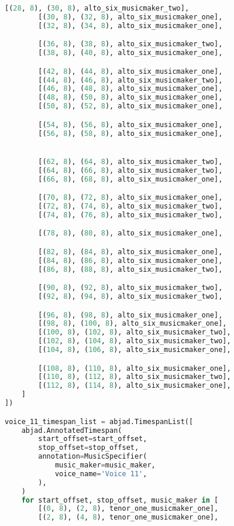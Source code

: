 \begin{lstlisting}[language=Python, caption=Invocation Source Code]
        [(28, 8), (30, 8), alto_six_musicmaker_two],
        [(30, 8), (32, 8), alto_six_musicmaker_one],
        [(32, 8), (34, 8), alto_six_musicmaker_one],

        [(36, 8), (38, 8), alto_six_musicmaker_two],
        [(38, 8), (40, 8), alto_six_musicmaker_one],

        [(42, 8), (44, 8), alto_six_musicmaker_one],
        [(44, 8), (46, 8), alto_six_musicmaker_two],
        [(46, 8), (48, 8), alto_six_musicmaker_one],
        [(48, 8), (50, 8), alto_six_musicmaker_one],
        [(50, 8), (52, 8), alto_six_musicmaker_one],

        [(54, 8), (56, 8), alto_six_musicmaker_one],
        [(56, 8), (58, 8), alto_six_musicmaker_one],


        [(62, 8), (64, 8), alto_six_musicmaker_two],
        [(64, 8), (66, 8), alto_six_musicmaker_two],
        [(66, 8), (68, 8), alto_six_musicmaker_one],

        [(70, 8), (72, 8), alto_six_musicmaker_one],
        [(72, 8), (74, 8), alto_six_musicmaker_two],
        [(74, 8), (76, 8), alto_six_musicmaker_two],

        [(78, 8), (80, 8), alto_six_musicmaker_one],

        [(82, 8), (84, 8), alto_six_musicmaker_one],
        [(84, 8), (86, 8), alto_six_musicmaker_one],
        [(86, 8), (88, 8), alto_six_musicmaker_two],

        [(90, 8), (92, 8), alto_six_musicmaker_two],
        [(92, 8), (94, 8), alto_six_musicmaker_two],

        [(96, 8), (98, 8), alto_six_musicmaker_one],
        [(98, 8), (100, 8), alto_six_musicmaker_one],
        [(100, 8), (102, 8), alto_six_musicmaker_two],
        [(102, 8), (104, 8), alto_six_musicmaker_two],
        [(104, 8), (106, 8), alto_six_musicmaker_one],

        [(108, 8), (110, 8), alto_six_musicmaker_one],
        [(110, 8), (112, 8), alto_six_musicmaker_two],
        [(112, 8), (114, 8), alto_six_musicmaker_one],
    ]
])

voice_11_timespan_list = abjad.TimespanList([
    abjad.AnnotatedTimespan(
        start_offset=start_offset,
        stop_offset=stop_offset,
        annotation=MusicSpecifier(
            music_maker=music_maker,
            voice_name='Voice 11',
        ),
    )
    for start_offset, stop_offset, music_maker in [
        [(0, 8), (2, 8), tenor_one_musicmaker_one],
        [(2, 8), (4, 8), tenor_one_musicmaker_one],


\end{lstlisting}
